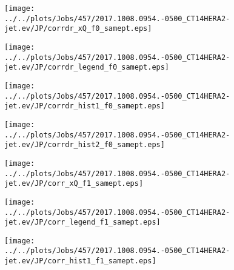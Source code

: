 \documentclass[12pt]{article}
\begin{document}
\begin{figure}
\texttt{[image: ../../plots/Jobs/457/2017.1008.0954.-0500\_CT14HERA2-jet.ev/JP/corrdr\_xQ\_f0\_samept.eps]}
\caption{}
\end{figure}\newpage\clearpage
\begin{figure}
\texttt{[image: ../../plots/Jobs/457/2017.1008.0954.-0500\_CT14HERA2-jet.ev/JP/corrdr\_legend\_f0\_samept.eps]}
\caption{}
\end{figure}\newpage\clearpage
\begin{figure}
\texttt{[image: ../../plots/Jobs/457/2017.1008.0954.-0500\_CT14HERA2-jet.ev/JP/corrdr\_hist1\_f0\_samept.eps]}
\caption{}
\end{figure}\newpage\clearpage
\begin{figure}
\texttt{[image: ../../plots/Jobs/457/2017.1008.0954.-0500\_CT14HERA2-jet.ev/JP/corrdr\_hist2\_f0\_samept.eps]}
\caption{}
\end{figure}\newpage\clearpage
\begin{figure}
\texttt{[image: ../../plots/Jobs/457/2017.1008.0954.-0500\_CT14HERA2-jet.ev/JP/corr\_xQ\_f1\_samept.eps]}
\caption{}
\end{figure}\newpage\clearpage
\begin{figure}
\texttt{[image: ../../plots/Jobs/457/2017.1008.0954.-0500\_CT14HERA2-jet.ev/JP/corr\_legend\_f1\_samept.eps]}
\caption{}
\end{figure}\newpage\clearpage
\begin{figure}
\texttt{[image: ../../plots/Jobs/457/2017.1008.0954.-0500\_CT14HERA2-jet.ev/JP/corr\_hist1\_f1\_samept.eps]}
\caption{}
\end{figure}\newpage\clearpage
\end{document}
